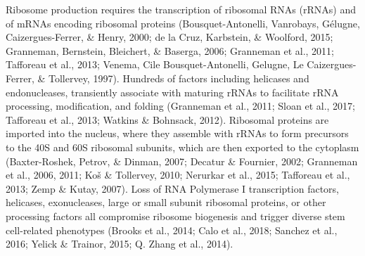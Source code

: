 \documentclass[12pt,oneside]{reedthesis}
\begin{document}
Ribosome production requires the transcription of ribosomal RNAs (rRNAs)
and of mRNAs encoding ribosomal proteins (Bousquet-Antonelli, Vanrobays, Gélugne, Caizergues-Ferrer, \& Henry, 2000; de la Cruz, Karbstein, \& Woolford, 2015; Granneman, Bernstein, Bleichert, \& Baserga, 2006; Granneman et al., 2011; Tafforeau et al., 2013; Venema, Cile Bousquet-Antonelli, Gelugne, Le Caizergues-Ferrer, \& Tollervey, 1997). Hundreds of factors
including helicases and endonucleases, transiently associate with
maturing rRNAs to facilitate rRNA processing, modification, and folding
(Granneman et al., 2011; Sloan et al., 2017; Tafforeau et al., 2013; Watkins \& Bohnsack, 2012).
Ribosomal proteins are imported into the nucleus, where they assemble
with rRNAs to form precursors to the 40S and 60S ribosomal subunits,
which are then exported to the cytoplasm (Baxter-Roshek, Petrov, \& Dinman, 2007; Decatur \& Fournier, 2002; Granneman et al., 2006, 2011; Koš \& Tollervey, 2010; Nerurkar et al., 2015; Tafforeau et al., 2013; Zemp \& Kutay, 2007). Loss of RNA Polymerase I transcription factors, helicases,
exonucleases, large or small subunit ribosomal proteins, or other
processing factors all compromise ribosome biogenesis and trigger
diverse stem cell-related phenotypes (Brooks et al., 2014; Calo et al., 2018; Sanchez et al., 2016; Yelick \& Trainor, 2015; Q. Zhang et al., 2014).
\end{document}
